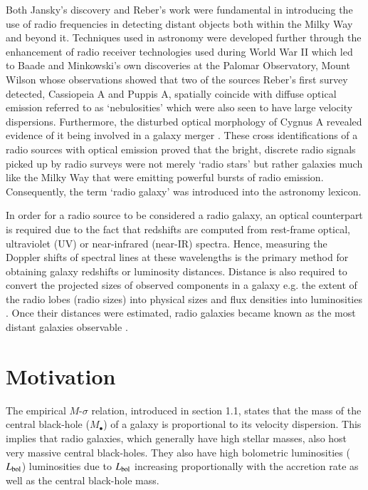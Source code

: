 Both Jansky's discovery and Reber's work were fundamental in introducing the use of radio frequencies in detecting distant objects both within the Milky Way and beyond it. Techniques used in astronomy were developed further through the enhancement of radio receiver technologies used during World War II which led to Baade and Minkowski's own discoveries at the Palomar Observatory, Mount Wilson whose observations showed that two of the sources Reber's first survey detected, Cassiopeia A and Puppis A, spatially coincide with diffuse optical emission referred to as `nebulosities' which were also seen to have large velocity dispersions. Furthermore, the disturbed optical morphology of Cygnus A revealed evidence of it being involved in a galaxy merger \citep{BaadeMinkowski1954}. These cross identifications of a radio sources with optical emission proved that the bright, discrete radio signals picked up by radio surveys were not merely `radio stars' but rather galaxies much like the Milky Way that were emitting powerful bursts of radio emission. Consequently, the term `radio galaxy' was introduced into the astronomy lexicon. 

In order for a radio source to be considered a radio galaxy, an optical counterpart is required due to the fact that redshifts are computed from rest-frame optical, ultraviolet (UV) or near-infrared (near-IR) spectra. Hence, measuring the Doppler shifts of spectral lines at these wavelengths is the primary method for obtaining galaxy redshifts or luminosity distances. Distance is also required to convert the projected sizes of observed components in a galaxy e.g. the extent of the radio lobes (radio sizes) into physical sizes and flux densities into luminosities \citep{Moffet1966}. Once their distances were estimated, radio galaxies became known as the most distant galaxies observable \citep{Stern1999}. 

\section{Motivation}\label{section:motivation}
The empirical $M$-$\sigma$ relation, introduced in section 1.1, states that the mass of the central black-hole ($M_\bullet$) of a galaxy is proportional to its velocity dispersion. This implies that radio galaxies, which generally have high stellar masses, also host very massive central black-holes. They also have high bolometric luminosities ($L_{\rm bol}$) luminosities due to $L_{\rm bol}$ increasing proportionally with the accretion rate as well as the central black-hole mass. 

